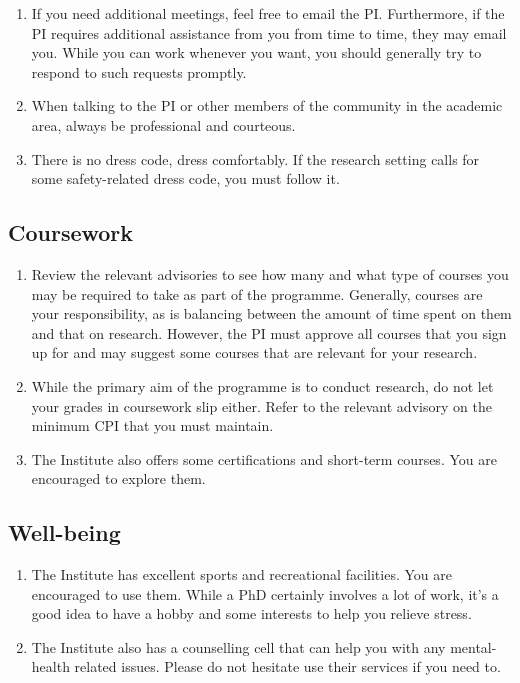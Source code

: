 \documentclass[12pt]{article}
\begin{document}
\begin{enumerate}
	\item If you need additional meetings, feel free to email the PI. Furthermore, if the PI requires additional assistance from you from time to time, they may email you. While you can work whenever you want, you should generally try to respond to such requests promptly. 
	\item When talking to the PI or other members of the community in the academic area, always be professional and courteous. 
	\item There is no dress code, dress comfortably. If the research setting calls for some safety-related dress code, you must follow it.
\end{enumerate}

\subsection{Coursework}
\begin{enumerate}
	\item Review the relevant advisories to see how many and what type of courses you may be required to take as part of the programme. Generally, courses are your responsibility, as is balancing between the amount of time spent on them and that on research. However, the PI must approve all courses that you sign up for and may suggest some courses that are relevant for your research.
	\item While the primary aim of the programme is to conduct research, do not let your grades in coursework slip either. Refer to the relevant advisory on the minimum CPI that you must maintain.
	\item The Institute also offers some certifications and short-term courses. You are encouraged to explore them.  
\end{enumerate}

\subsection{Well-being}
\begin{enumerate}
	\item The Institute has excellent sports and recreational facilities. You are encouraged to use them. While a PhD certainly involves a lot of work, it's a good idea to have a hobby and some interests to help you relieve stress.
	\item The Institute also has a counselling cell that can help you with any mental-health related issues. Please do not hesitate use their services if you need to.
\end{enumerate}
\end{document}
